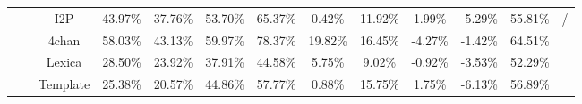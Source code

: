 \begin{table*}
{\begin{tabular}{c|c|c|c|c|c|c|c|c|c|c|c|c|c|c|c|c|c|c}
                              &       & I2P      & 43.97\% & 37.76\% & 53.70\%  & 65.37\%  & 0.42\%   & 11.92\% & 1.99\%   & -5.29\% & 55.81\% &                                                      \\ 
                              &                                & 4chan    & 58.03\% & 43.13\% & 59.97\%  & 78.37\%  & 19.82\%  & 16.45\% & -4.27\%  & -1.42\% & 64.51\% &                                                                        \\ 
              &                                & Lexica   & 28.50\% & 23.92\% & 37.91\%  & 44.58\%  & 5.75\%   & 9.02\%  & -0.92\%  & -3.53\% & 52.29\% &                                                                        \\ 
                      &                                & Template & 25.38\% & 20.57\% & 44.86\%  & 57.77\%  & 0.88\%   & 15.75\% & 1.75\%   & -6.13\% & 56.89\% &                                                                        \\
\bottomrule
\end{tabular}
}
\end{table*}
